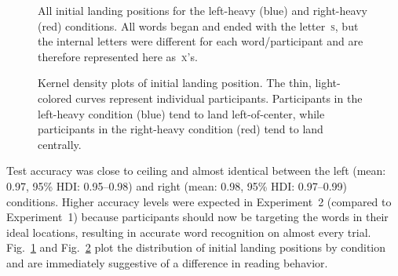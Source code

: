 \documentclass[doc,biblatex,floatsintext]{apa7}
\begin{document}
\begin{figure}
\vspace*{2pt}
\caption{All initial landing positions for the left-heavy (blue) and right-heavy (red) conditions. All words began and ended with the letter~\textsc{s}, but the internal letters were different for each word/participant and are therefore represented here as~\textsc{x}'s.}
\label{fig10}
\end{figure}

\begin{figure}
\vspace*{2pt}
\caption{Kernel density plots of initial landing position. The thin, light-colored curves represent individual participants. Participants in the left-heavy condition (blue) tend to land left-of-center, while participants in the right-heavy condition (red) tend to land centrally.}
\label{fig11}
\end{figure}

Test accuracy was close to ceiling and almost identical between the left (mean: 0.97, 95\% HDI: 0.95--0.98) and right (mean: 0.98, 95\% HDI: 0.97--0.99) conditions. Higher accuracy levels were expected in Experiment~2 (compared to Experiment~1) because participants should now be targeting the words in their ideal locations, resulting in accurate word recognition on almost every trial. Fig.~\ref{fig10} and Fig.~\ref{fig11} plot the distribution of initial landing positions by condition and are immediately suggestive of a difference in reading behavior.
\end{document}
